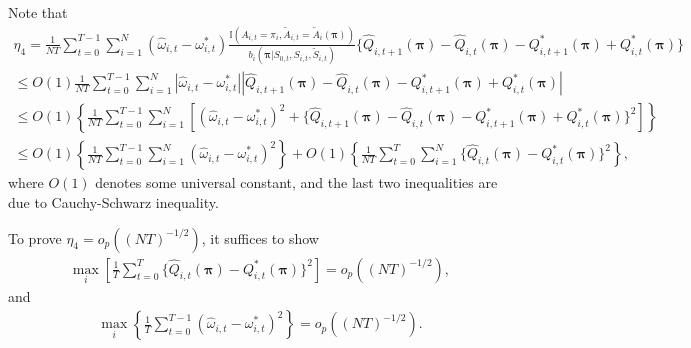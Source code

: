 \documentclass{article}
\begin{document}
Note that
\begin{eqnarray*}
	\eta_4=\frac{1}{NT}\sum_{t=0}^{T-1}\sum_{i=1}^N (\widehat{\omega}_{i,t}-\omega_{i,t}^*)\frac{\mathbb{I}(A_{i,t}=\pi_i,\widetilde{A}_{i,t}=\widetilde{A}_i(\bm{\pi}))}{b_i(\bm{\pi}|S_{0,t},S_{i,t},\widetilde{S}_{i,t})}\{\widehat{Q}_{i,t+1}(\bm{\pi})-\widehat{Q}_{i,t}(\bm{\pi})-Q_{i,t+1}^*(\bm{\pi})+Q_{i,t}^*(\bm{\pi}) \}\\
	\le O(1) \frac{1}{NT}\sum_{t=0}^{T-1}\sum_{i=1}^N |\widehat{\omega}_{i,t}-\omega_{i,t}^*||\widehat{Q}_{i,t+1}(\bm{\pi})-\widehat{Q}_{i,t}(\bm{\pi})-Q_{i,t+1}^*(\bm{\pi})+Q_{i,t}^*(\bm{\pi})|\\
	\le O(1) \left\{ \frac{1}{NT}\sum_{t=0}^{T-1}\sum_{i=1}^N [(\widehat{\omega}_{i,t}-\omega_{i,t}^*)^2+\{\widehat{Q}_{i,t+1}(\bm{\pi})-\widehat{Q}_{i,t}(\bm{\pi})-Q_{i,t+1}^*(\bm{\pi})+Q_{i,t}^*(\bm{\pi})\}^2] \right\}\\
	\le O(1) \left\{ \frac{1}{NT}\sum_{t=0}^{T-1}\sum_{i=1}^N (\widehat{\omega}_{i,t}-\omega_{i,t}^*)^2\right\}+O(1) \left\{ \frac{1}{NT}\sum_{t=0}^{T}\sum_{i=1}^N\{\widehat{Q}_{i,t}(\bm{\pi})- Q_{i,t}^*(\bm{\pi})\}^2\right\},
\end{eqnarray*}
where $O(1)$ denotes some universal constant, and the last two inequalities are due to Cauchy-Schwarz inequality. 

To prove $\eta_4=o_p((NT)^{-1/2})$, it suffices to show
\begin{eqnarray}\label{eqn:Qsq}
\max_i \left[\frac{1}{T} \sum_{t=0}^{T}\{\widehat{Q}_{i,t}(\bm{\pi})-Q_{i,t}^*(\bm{\pi})\}^2 \right]=o_p((NT)^{-1/2}),
\end{eqnarray}
and
\begin{eqnarray}\label{eqn:omegasq}
	\max_i \left\{ \frac{1}{T} \sum_{t=0}^{T-1}(\widehat{\omega}_{i,t}-\omega_{i,t}^*)^2 \right\}=o_p((NT)^{-1/2}).
\end{eqnarray}
\end{document}
